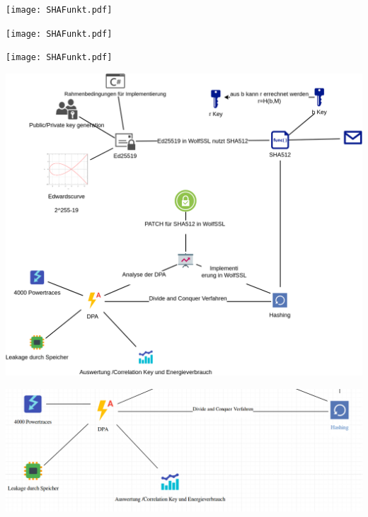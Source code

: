 \documentclass[
  11 pt,
  ignorenonframetext,
  aspectratio=43,
]{beamer}
\begin{document}
\begin{frame}{}
\protect\hypertarget{section-18}{}
\texttt{[image: SHAFunkt.pdf]}
\end{frame}

\begin{frame}{}
\protect\hypertarget{section-19}{}
\texttt{[image: SHAFunkt.pdf]}
\end{frame}

\begin{frame}{}
\protect\hypertarget{section-20}{}
\texttt{[image: SHAFunkt.pdf]}
\end{frame}

\begin{frame}{}
\protect\hypertarget{section-21}{}
\includegraphics{Abbildungen/ITSEC(1)_res.png}
\end{frame}

\begin{frame}{}
\protect\hypertarget{section-22}{}
\includegraphics{Abbildungen/Punkt4.png}
\end{frame}
\end{document}
